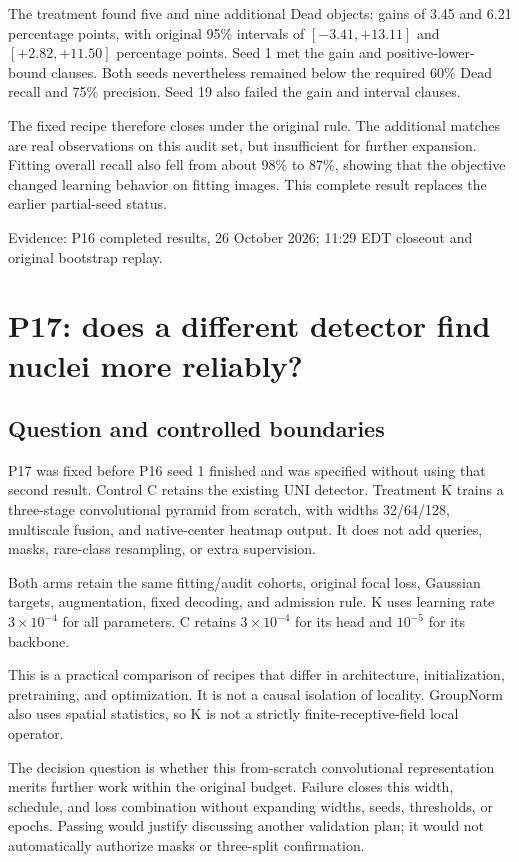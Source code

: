 \documentclass[11pt,a4paper]{article}
\newcommand{\src}[1]{\par{\footnotesize\color{gray}Evidence: #1}\par}
\begin{document}
The treatment found five and nine additional Dead objects: gains of 3.45 and 6.21 percentage points, with original 95\% intervals of $[-3.41,+13.11]$ and $[+2.82,+11.50]$ percentage points. Seed 1 met the gain and positive-lower-bound clauses. Both seeds nevertheless remained below the required 60\% Dead recall and 75\% precision. Seed 19 also failed the gain and interval clauses.

The fixed recipe therefore closes under the original rule. The additional matches are real observations on this audit set, but insufficient for further expansion. Fitting overall recall also fell from about 98\% to 87\%, showing that the objective changed learning behavior on fitting images. This complete result replaces the earlier partial-seed status.

\src{P16 completed results, 26 October 2026; 11:29 EDT closeout and original bootstrap replay.}



\section{P17: does a different detector find nuclei more reliably?}

\subsection{Question and controlled boundaries}

P17 was fixed before P16 seed 1 finished and was specified without using that second result. Control C retains the existing UNI detector. Treatment K trains a three-stage convolutional pyramid from scratch, with widths 32/64/128, multiscale fusion, and native-center heatmap output. It does not add queries, masks, rare-class resampling, or extra supervision.

Both arms retain the same fitting/audit cohorts, original focal loss, Gaussian targets, augmentation, fixed decoding, and admission rule. K uses learning rate $3\times10^{-4}$ for all parameters. C retains $3\times10^{-4}$ for its head and $10^{-5}$ for its backbone.

This is a practical comparison of recipes that differ in architecture, initialization, pretraining, and optimization. It is not a causal isolation of locality. GroupNorm also uses spatial statistics, so K is not a strictly finite-receptive-field local operator.

The decision question is whether this from-scratch convolutional representation merits further work within the original budget. Failure closes this width, schedule, and loss combination without expanding widths, seeds, thresholds, or epochs. Passing would justify discussing another validation plan; it would not automatically authorize masks or three-split confirmation.
\end{document}
